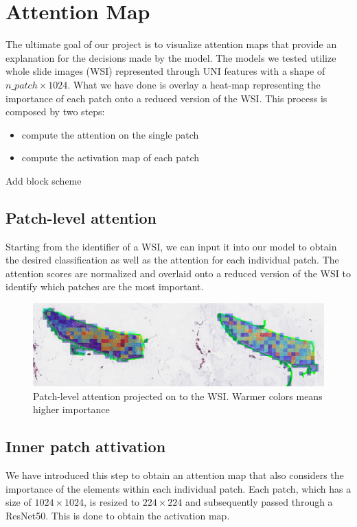\documentclass{article}
\begin{document}
\clearpage
\section{Attention Map} %
The ultimate goal of our project is to visualize attention maps that provide an explanation for the decisions made by the model. The models we tested utilize whole slide images (WSI) represented through UNI features with a shape of $n\_patch\times1024$. What we have done is overlay a heat-map representing the importance of each patch onto a reduced version of the WSI.
This process is composed by two steps:
\begin{itemize}
	\item compute the attention on the single patch
	\item compute the activation map of each patch
\end{itemize}

Add block scheme

\subsection{Patch-level attention}

Starting from the identifier of a WSI, we can input it into our model to obtain the desired classification as well as the attention for each individual patch. The attention scores are normalized and overlaid onto a reduced version of the WSI to identify which patches are the most important.

\begin{figure}[h]
	\centering
	\includegraphics[width=1\textwidth]{images/old_attention_map_val.png}
	\caption{Patch-level attention projected on to the WSI. Warmer colors means higher importance}
\end{figure}


\subsection{Inner patch attivation}
We have introduced this step to obtain an attention map that also considers the importance of the elements within each individual patch. Each patch, which has a size of $1024\times1024$, is resized to $224\times224$ and subsequently passed through a ResNet50. This is done to obtain the activation map.
\end{document}
